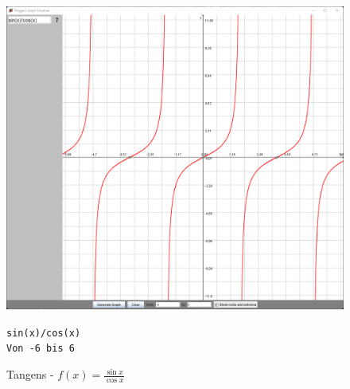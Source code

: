 \documentclass[12pt]{article}
\begin{document}
	\begin{figure}[!ht]
		\begin{center}
		\includegraphics[scale=0.5]{images/sample3.png}
		\end{center}
		\caption{Tangens - $f(x) = \frac{\sin{x}}{\cos{x}}$}

		\begin{center}
			\texttt{sin(x)/cos(x)} \\
			\texttt{Von -6 bis 6}
		\end{center}
	\end{figure}
\end{document}
